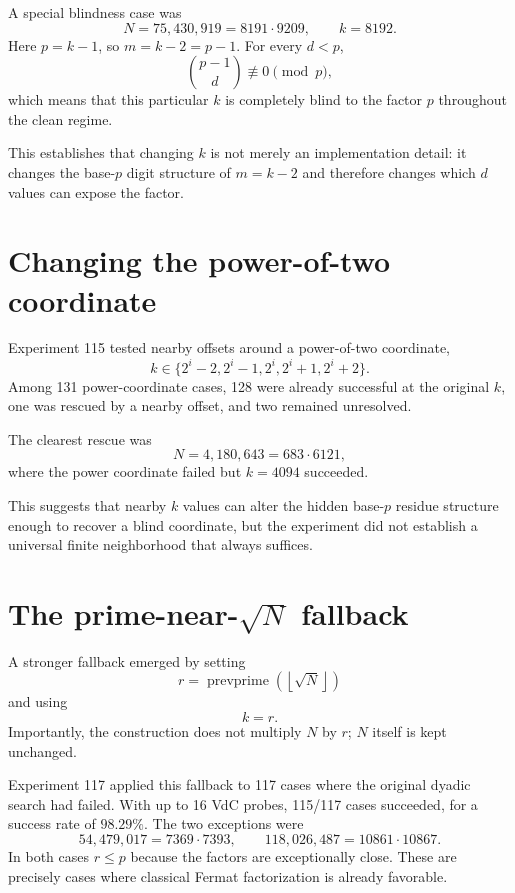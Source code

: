 \documentclass[11pt,a4paper]{article}
\newcommand{\floor}[1]{\left\lfloor #1 \right\rfloor}
\begin{document}
A special blindness case was
\[
N=75{,}430{,}919=8191\cdot9209,
\qquad k=8192.
\]
Here $p=k-1$, so $m=k-2=p-1$. For every $d<p$,
\[
\binom{p-1}{d}\not\equiv0\pmod p,
\]
which means that this particular $k$ is completely blind to the factor $p$ throughout the clean regime.

This establishes that changing $k$ is not merely an implementation detail: it changes the base-$p$ digit structure of $m=k-2$ and therefore changes which $d$ values can expose the factor.

\section{Changing the power-of-two coordinate}
\label{sec:kvariation}

Experiment 115 tested nearby offsets around a power-of-two coordinate,
\[
k\in\{2^i-2,2^i-1,2^i,2^i+1,2^i+2\}.
\]
Among 131 power-coordinate cases, 128 were already successful at the original $k$, one was rescued by a nearby offset, and two remained unresolved.

The clearest rescue was
\[
N=4{,}180{,}643=683\cdot6121,
\]
where the power coordinate failed but $k=4094$ succeeded.

This suggests that nearby $k$ values can alter the hidden base-$p$ residue structure enough to recover a blind coordinate, but the experiment did not establish a universal finite neighborhood that always suffices.

\section{The prime-near-$\sqrt N$ fallback}
\label{sec:fallback}

A stronger fallback emerged by setting
\begin{equation}
 r=\operatorname{prevprime}(\floor{\sqrt N})
\end{equation}
and using
\[
k=r.
\]
Importantly, the construction does not multiply $N$ by $r$; $N$ itself is kept unchanged.

Experiment 117 applied this fallback to 117 cases where the original dyadic search had failed. With up to 16 VdC probes, 115/117 cases succeeded, for a success rate of $98.29\%$. The two exceptions were
\[
54{,}479{,}017=7369\cdot7393,
\qquad
118{,}026{,}487=10861\cdot10867.
\]
In both cases $r\le p$ because the factors are exceptionally close. These are precisely cases where classical Fermat factorization is already favorable.
\end{document}

